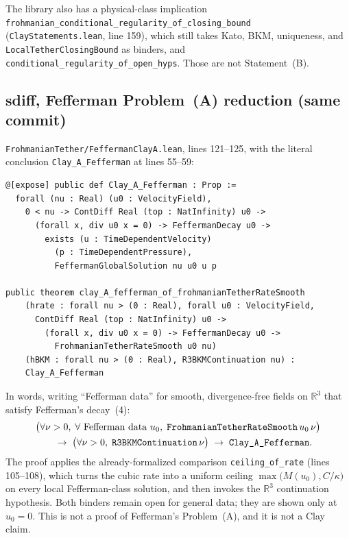 \documentclass[11pt]{article}
\theoremstyle{plain}
\theoremstyle{definition}
\theoremstyle{remark}
\newcommand{\R}{\mathbb{R}}
\begin{document}
The library also has a physical-class implication \texttt{frohmanian\_\hspace{0pt}conditional\_\hspace{0pt}regularity\_\hspace{0pt}of\_\hspace{0pt}closing\_\hspace{0pt}bound} (\texttt{ClayStatements.\hspace{0pt}lean}, line 159), which still takes Kato, BKM, uniqueness, and \texttt{LocalTetherClosingBound} as binders, and \texttt{conditional\_\hspace{0pt}regularity\_\hspace{0pt}of\_\hspace{0pt}open\_\hspace{0pt}hyps}. Those are not Statement~(B).

\subsection{sdiff, Fefferman Problem~(A) reduction (same commit)}
\label{sec:clay-a-reduction}

{\sloppy \texttt{FrohmanianTether/\hspace{0pt}FeffermanClayA.\hspace{0pt}lean}, lines 121--125, with the literal conclusion \texttt{Clay\_\hspace{0pt}A\_\hspace{0pt}Fefferman} at lines 55--59:}
\begin{lstlisting}
@[expose] public def Clay_A_Fefferman : Prop :=
  forall (nu : Real) (u0 : VelocityField),
    0 < nu -> ContDiff Real (top : NatInfinity) u0 ->
      (forall x, div u0 x = 0) -> FeffermanDecay u0 ->
        exists (u : TimeDependentVelocity)
          (p : TimeDependentPressure),
          FeffermanGlobalSolution nu u0 u p

public theorem clay_A_fefferman_of_frohmanianTetherRateSmooth
    (hrate : forall nu > (0 : Real), forall u0 : VelocityField,
      ContDiff Real (top : NatInfinity) u0 ->
        (forall x, div u0 x = 0) -> FeffermanDecay u0 ->
          FrohmanianTetherRateSmooth u0 nu)
    (hBKM : forall nu > (0 : Real), R3BKMContinuation nu) :
    Clay_A_Fefferman
\end{lstlisting}
In words, writing ``Fefferman data'' for smooth, divergence-free fields on \(\R^{3}\) that satisfy Fefferman's decay~(4):
\begin{align*}
&\bigl(\forall\nu>0,\;\forall\text{ Fefferman data }u_{0},\;
  \texttt{FrohmanianTether\allowbreak RateSmooth}\,u_{0}\,\nu\bigr) \\
&\qquad\to\;
\bigl(\forall\nu>0,\;\texttt{R3BKMContinuation}\,\nu\bigr)
\;\to\;
\texttt{Clay\_A\_Fefferman}.
\end{align*}
The proof applies the already-formalized comparison \texttt{ceiling\_of\_rate} (lines 105--108), which turns the cubic rate into a uniform ceiling \(\max\bigl(M(u_{0}),C/\kappa\bigr)\) on every local Fefferman-class solution, and then invokes the \(\R^{3}\) continuation hypothesis. Both binders remain open for general data; they are shown only at \(u_{0}=0\). This is not a proof of Fefferman's Problem~(A), and it is not a Clay claim.
\end{document}
